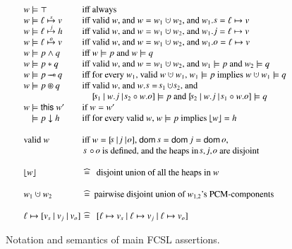 \begin{figure}[t]
\[
{\small
\begin{array}[t]{l@{\,}l}
  w \models \top & \mbox{iff always}\\
  w \models \hlabel \spts v & \mbox{iff valid $w$, and $w = w_1 \hunion
    w_2$, and $w_1.\mathself = \hlabel \hpts v$}\\ 
  w \models \hlabel \jpts h & \mbox{iff valid $w$, and $w = w_1 \hunion
    w_2$, and $w_1.\mathjoint = \hlabel \hpts v$}\\ 
  w \models \hlabel \opts v & \mbox{iff valid $w$, and $w = w_1 \hunion
    w_2$, and $w_1.\mathother = \hlabel \hpts v$}\\ 
  w \models p \aand q & \mbox{iff $w \models p$ and $w \models q$}\\
  w \models p \lsep q & \mbox{iff valid $w$, and $w = w_1 \hunion w_2$, and $w_1 \models p$ and $w_2 \models q$}\\
  w \models p \wand q & \mbox{iff for every $w_1$, valid $w \hunion w_1$, $w_1 \models p$ implies $w \hunion w_1 \models q$}\\
  w \models p \ssep q & \mbox{iff valid $w$, and $w.\mathself= \mathself_1 \hunion \mathself_2$, and}\\
  & \hphantom{\mbox{iff}}\ \mbox{$\state{\mathself_1}{w.\mathjoint}{{\mathself_2} \zip {w.\mathother}}
    \models p$ and $\state{\mathself_2}{w.\mathjoint}{{\mathself_1} \zip
      {w.\mathother}} \models q$}\\
  w \models \mathsf{this}\ w' & \mbox{if $w = w'$}\\
  \hphantom{w} \models p \downarrow h & \mbox{iff for every valid $w$, $w
    \models p$ implies $\flatten w = h$}
  \\
  \\
  \mbox{valid $w$} & \mbox{iff $w=\state{\mathself}{\mathjoint}{\mathother}$, 
                           $\mathsf{dom}\,\mathself = \mathsf{dom}\,\mathjoint = \mathsf{dom}\,\mathother$,}\\
  & \mbox{ $\mathself\,{\zip}\,\mathother$ is defined, 
           and the heaps in $\mathself$, $\mathjoint$, $\mathother$
           are disjoint}
         \\\\
  \flatten w & \eqdef \mbox{ disjoint union of all the heaps in $w$}
  \\\\
  w_1 \hunion w_2 & \eqdef \mbox{pairwise disjoint union of $w_{1,2}$'s
    PCM-components}
  \\\\
  \hlabel \hpts \state{{v_s}}{{v_j}}{{v_o}} & \eqdef \mbox{ $\state{{\hlabel \hpts v_s}}{{\hlabel \hpts v_j}}{{\hlabel \hpts v_o}}$}
\end{array}}
\]
\caption{Notation and semantics of main FCSL assertions.}
\label{fig:broccoli}
\end{figure}
%

